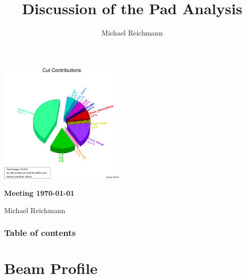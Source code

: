 \documentclass[9pt]{beamer}
\title[Analysis]{Discussion of the Pad Analysis}
\author[M. Reichmann]{Michael Reichmann}
\institute[\textbf{\textit{ETH}}\scalebox{.6}{\textit{Z\"{u}rich}}]{Swiss Federal Institute of Technology Zurich}
\begin{document}
\begin{frame}
	\begin{center}
		\includegraphics[width=6cm]{CutContributions}
	\end{center}
	\begin{alertblock}{
		\begin{center}
			\textbf{Meeting \today}
		\end{center}}
		\vspace*{10pt}
		\begin{center}\small
		Michael Reichmann
		\end{center}\normalsize
	\end{alertblock}
\end{frame}
\begin{frame}[allowframebreaks]
	\frametitle{Table of contents}
	\tableofcontents   %
\end{frame}
\section{Beam Profile}
\end{document}
